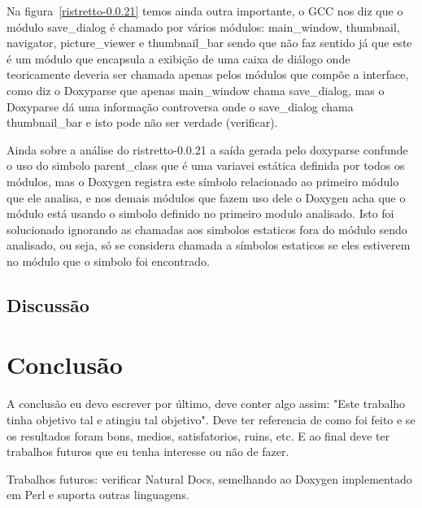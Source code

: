 Na figura~\ref{ristretto-0.0.21} temos ainda outra importante, o GCC nos diz
que o módulo save\_dialog é chamado por vários módulos: main\_window,
thumbnail, navigator, picture\_viewer e thumbnail\_bar sendo que não faz
sentido já que este é um módulo que encapsula a exibição de uma caixa de
diálogo onde teoricamente deveria ser chamada apenas pelos módulos que compõe a
interface, como diz o Doxyparse que apenas main\_window chama save\_dialog, mas
o Doxyparse dá uma informação controversa onde o save\_dialog chama
thumbnail\_bar e isto pode não ser verdade (verificar).

Ainda sobre a análise do ristretto-0.0.21 a saída gerada pelo doxyparse
confunde o uso do simbolo parent\_class que é uma variavei estática definida
por todos os módulos, mas o Doxygen registra este símbolo relacionado ao
primeiro módulo que ele analisa, e nos demais módulos que fazem uso dele o
Doxygen acha que o módulo está usando o simbolo definido no primeiro modulo
analisado. Isto foi solucionado ignorando as chamadas aos simbolos estaticos
fora do módulo sendo analisado, ou seja, só se considera chamada a símbolos
estaticos se eles estiverem no módulo que o simbolo foi encontrado.

\section{Discussão}

\chapter{Conclusão}

A conclusão eu devo escrever por último, deve conter algo assim: "Este trabalho
tinha objetivo tal e atingiu tal objetivo". Deve ter referencia de como foi
feito e se os resultados foram bons, medios, satisfatorios, ruins, etc. E ao
final deve ter trabalhos futuros que eu tenha interesse ou não de fazer.

Trabalhos futuros: verificar Natural Docs, semelhando ao Doxygen implementado
em Perl e suporta outras linguagens.
